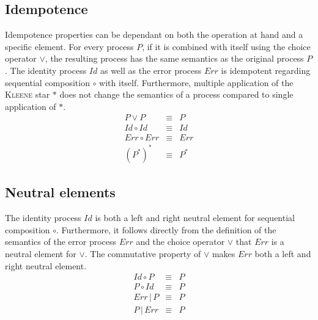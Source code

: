 \subsection{Idempotence}
Idempotence properties can be dependant on both the operation at hand and a specific element. For every process $P$, if it is combined with itself using the choice operator $\vee$, the resulting process has the same semantics as the original process $P$. The identity process $Id$ as well as the error process $Err$ is idempotent regarding sequential composition $\circ$ with itself. Furthermore, multiple application of the \textsc{Kleene} star $*$ does not change the semantics of a process compared to single application of $*$.
\begin{eqnarray*}
  P \vee P & \equiv & P \\
  Id \circ Id & \equiv & Id \\
  Err \circ Err & \equiv & Err \\
  (P^*)^* & \equiv & P^*
\end{eqnarray*}

\subsection{Neutral elements}
The identity process $Id$ is both a left and right neutral element for sequential composition $\circ$. Furthermore, it follows directly from the definition of the semantics of the error process $Err$ and the choice operator $\vee$ that $Err$ is a neutral element for $\vee$. The commutative property of $\vee$ makes $Err$ both a left and right neutral element.
\begin{eqnarray*}
  Id \circ P & \equiv & P \\
  P \circ Id & \equiv & P \\
  Err \,|\, P & \equiv & P \\
  P \,|\, Err & \equiv & P
\end{eqnarray*}